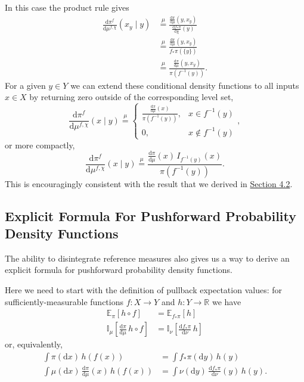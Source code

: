 \documentclass[
  letterpaper,
  DIV=11,
  numbers=noendperiod]{scrartcl}
\begin{document}
In this case the product rule gives \begin{align*}
\frac{ \mathrm{d}  \pi^{f} }{ \mathrm{d}  \mu^{f, \chi}  } (x_{y} \mid y)
&\overset{ \mu }{ = }
\frac{ \frac{ \mathrm{d} \pi}{ \mathrm{d} \mu }(y, x_{y}) }{ \frac{ \mathrm{d}  f_{*} \pi }{ \mathrm{d} \chi }(y) }
\\
&\overset{ \mu }{ = }
\frac{ \frac{ \mathrm{d} \pi}{ \mathrm{d} \mu }(y, x_{y}) }{ f_{*} \pi ( \{ y \} ) }
\\
&\overset{ \mu }{ = }
\frac{ \frac{ \mathrm{d} \pi}{ \mathrm{d} \mu }(y, x_{y}) }{ \pi ( f^{-1}(y) ) }.
\end{align*} For a given \(y \in Y\) we can extend these conditional
density functions to all inputs \(x \in X\) by returning zero outside of
the corresponding level set, \[
\frac{ \mathrm{d}  \pi^{f} }{ \mathrm{d}  \mu^{f, \chi}  } (x \mid y)
\overset{ \mu }{ = }
\left\{
\begin{array}{rr}
\frac{ \frac{ \mathrm{d} \pi}{ \mathrm{d} \mu }(x) }{ \pi ( f^{-1}(y) ) }, & x \in f^{-1}(y) \\
0, & x \notin f^{-1}(y)
\end{array}
\right. ,
\] or more compactly, \[
\frac{ \mathrm{d}  \pi^{f} }{ \mathrm{d}  \mu^{f, \chi}  } (x \mid y)
\overset{ \mu }{ = }
\frac{ \frac{ \mathrm{d} \pi}{ \mathrm{d} \mu }(x) \, I_{f^{-1}(y)}(x) }{ \pi ( f^{-1}(y) ) }.
\] This is encouragingly consistent with the result that we derived in
\hyperref[sec:discrete-conditional-density]{Section 4.2}.

\subsection{Explicit Formula For Pushforward Probability Density
Functions}\label{explicit-formula-for-pushforward-probability-density-functions}

The ability to disintegrate reference measures also gives us a way to
derive an explicit formula for pushforward probability density
functions.

Here we need to start with the definition of pullback expectation
values: for sufficiently-measurable functions \(f : X \rightarrow Y\)
and \(h : Y \rightarrow \mathbb{R}\) we have \begin{align*}
\mathbb{E}_{\pi} \! \left[  h \circ f  \right]
&=
\mathbb{E}_{f_{*} \pi} \! \left[  h  \right]
\\
\mathbb{I}_{\mu} \! \left[  \frac{ \mathrm{d}  \pi }{ \mathrm{d}  \mu  } \, h \circ f  \right]
&=
\mathbb{I}_{\nu} \! \left[  \frac{ \mathrm{d}  f_{*} \pi }{ \mathrm{d}  \nu  } \, h  \right]
\end{align*} or, equivalently, \begin{align*}
\int \pi( \mathrm{d} x ) \, h(f(x))
&=
\int f_{*} \pi( \mathrm{d} y )  \, h(y)
\\
\int \mu( \mathrm{d} x ) \, \frac{ \mathrm{d}  \pi }{ \mathrm{d}  \mu  }(x) \, h(f(x))
&=
\int \nu( \mathrm{d} y ) \, \frac{ \mathrm{d}  f_{*} \pi }{ \mathrm{d}  \nu  }(y) \, h(y).
\end{align*}
\end{document}
